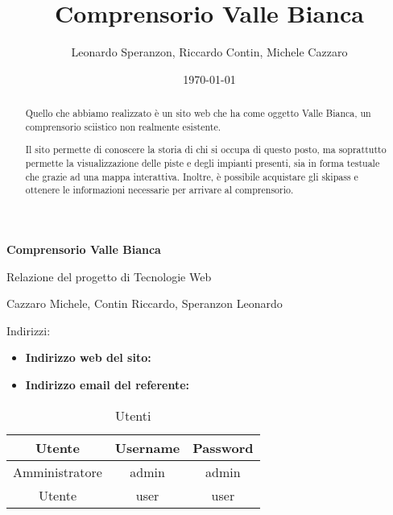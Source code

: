 \documentclass[12pt, a4paper]{article}
\title{Comprensorio Valle Bianca}
\author{Leonardo Speranzon, Riccardo Contin, Michele Cazzaro}
\date{\today}
\begin{document}
    \begin{titlepage}
        \begin{center}
            \vspace*{1cm}
            
            \Huge
            \textbf{Comprensorio Valle Bianca}

            \vspace{0.5cm}
            \LARGE
            Relazione del progetto di Tecnologie Web

            \vspace{1.5cm}
            \Large
            Cazzaro Michele, Contin Riccardo, Speranzon Leonardo
        \end{center}
            \vfill

            \large
            Indirizzi:
            \begin{itemize}
                \item \textbf{Indirizzo web del sito: } \url{}
                \item \textbf{Indirizzo email del referente: } \url{}
            \end{itemize}

            \begin{table}[H]
                \centering
                \begin{tabular}{|c|c|c|}
                    \hline
                    \rowcolor[HTML]{96FFFB} 
                    \textbf{Utente} & \textbf{Username} & \textbf{Password} \\ \hline
                    Amministratore & admin & admin \\ \hline
                    Utente & user & user \\ \hline
                \end{tabular}
                \caption{Utenti}
            \end{table}
        
    \end{titlepage}

    \tableofcontents

    \newpage

    \begin{abstract}
        Quello che abbiamo realizzato è un sito web che ha come oggetto Valle Bianca, un comprensorio sciistico non realmente esistente.

        Il sito permette di conoscere la storia di chi si occupa di questo posto, ma soprattutto permette la visualizzazione delle piste e degli impianti presenti, sia in forma
        testuale che grazie ad una mappa interattiva. Inoltre, è possibile acquistare gli skipass e ottenere le informazioni necessarie per arrivare al comprensorio. 
    \end{abstract}

    
    \newpage
    
    \newpage
    
    \newpage
    
\end{document}
